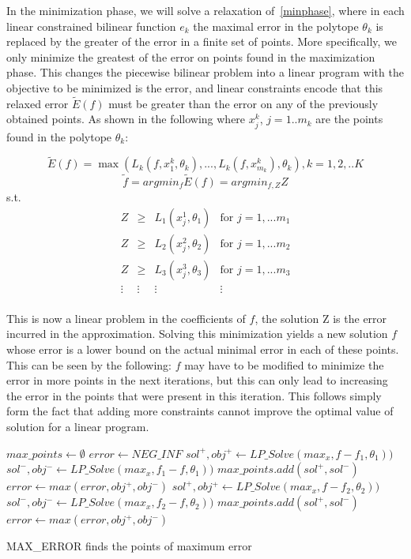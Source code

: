 In the minimization phase, we will solve a relaxation of~\ref{minphase}, where in each linear constrained bilinear function $e_k$ the maximal error in the polytope $\theta_k$ is replaced by the greater of the error in a finite set of points. More specifically, we only minimize the greatest of the error on points found in the maximization phase. This changes the piecewise bilinear problem into a linear program with the objective to be minimized is the error, and linear constraints encode that this relaxed error $\tilde{E}(f)$ must be greater than the error on any of the previously obtained points. As shown in the following where $x^k_j$, $j=1..m_k$ are the points found in the polytope $\theta_k$:

$$ \tilde{E}(f) =\max ( L_k (f, x^k_1, \theta_k), ... , L_k ( f, x^k_{m_k}), \theta_k ), k = 1, 2, .. K$$
$$\tilde{f} = argmin_f\tilde{E}(f) = argmin_{f,Z}  Z $$
s.t. 
$$
	\begin{array}{llll}
		Z & \geq & L_1(x^1_j, \theta_1) & \mbox{for } j = 1,...m_1\\
		Z & \geq & L_2(x^2_j, \theta_2) & \mbox{for } j = 1,...m_2\\
		Z & \geq & L_3(x^3_j, \theta_3) & \mbox{for } j = 1,...m_3\\
		\vdots & \vdots & \vdots & \vdots\\
	\end{array}
$$

This is now a linear problem in the coefficients of $f$, the solution Z is the error incurred in the approximation. 
Solving this minimization yields a new solution $f$ whose error is a lower bound on the actual minimal error in each of these points. This can be seen by the following: $f$ may have to be modified to minimize the error in more points in the next iterations, but this can only lead to increasing the error in the points that were present in this iteration. This follows simply form the fact that adding more constraints cannot improve the optimal value of solution for a linear program.


\begin{algorithm}[!ht]
\dontprintsemicolon
{}
$max\_points \gets \emptyset$\;
$error \gets NEG\_INF$\;
 {
	$sol^+, obj^+ \gets LP\_Solve(max _x, f-f_1,\theta_1) )$\;
	$sol^-, obj^- \gets LP\_Solve(max _x, f_1-f,\theta_1) )$\;
	$max\_points.add(sol^+,sol^-)$\; 	$error \gets max(error, obj^+, obj^-)$\; 
	}
 {
	$sol^+, obj^+ \gets LP\_Solve(max _x, f-f_2,\theta_2) )$\;
	$sol^-, obj^- \gets LP\_Solve(max _x, f_2-f,\theta_2) )$\;
	$max\_points.add(sol^+,sol^-)$\; 	$error \gets max(error, obj^+, obj^-)$\; 
	}\;
\caption{{\sc MAX\_ERROR} finds the points of maximum error}
\label{alg:maxError}
\end{algorithm}



